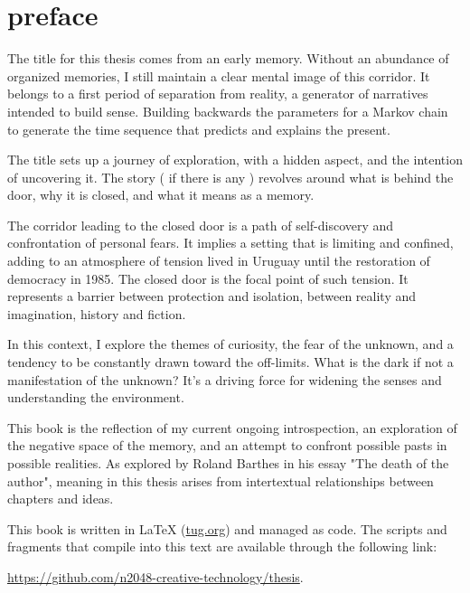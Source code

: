 \chapter*{preface}
\normalsize

\newpage  %
The title for this thesis comes from an early memory. Without an abundance of organized memories, I still maintain a clear mental image of this corridor. It belongs to a first period of separation from reality, a generator of narratives intended to build sense. Building backwards the parameters for a Markov chain to generate the time sequence that predicts and explains the present.    

The title sets up a journey of exploration, with a hidden aspect, and the intention of uncovering it. The story ( if there is any ) {r}evolves around what is behind the door, why it is closed, and what it means as a memory.

The corridor leading to the closed door is a path of self-discovery and confrontation of personal fears. It implies a setting that is limiting and confined, adding to an atmosphere of tension lived in Uruguay until the restoration of democracy in 1985. The closed door is the focal point of such tension. It represents a barrier between protection and isolation, between reality and imagination, history and fiction.

In this context, I explore the themes of curiosity, the fear of the unknown, and a tendency to be constantly drawn toward the off-limits. What is the dark if not a manifestation of the unknown? It's a driving force for widening the senses and understanding the environment.

This book is the reflection of my current ongoing introspection, an exploration of the negative space of the memory, and an attempt to confront possible pasts in possible realities. As explored by Roland Barthes in his essay "The death of the author"\citep{barthes1967}, meaning in this thesis arises from intertextual relationships between chapters and ideas. 



This book is written in \LaTeX{} (\href{https://www.tug.org/texlive/quickinstall.html}{tug.org}) and managed as code. The scripts and fragments that compile into this text are available through the following link: 

\href{https://github.com/n2048-creative-technology/thesis}{https://github.com/n2048-creative-technology/thesis}.